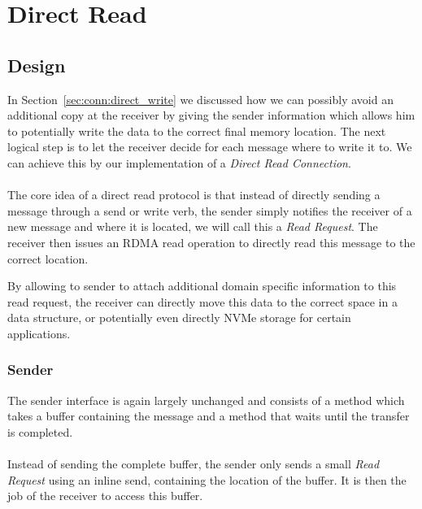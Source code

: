 
\section{Direct Read} \label{sec:conn:direct_read}
\subsection{Design}

In Section~\ref{sec:conn:direct_write} we discussed how we can possibly avoid an additional copy at the receiver by giving 
the sender information which allows him to potentially write the data to the correct final memory location. The next logical
step is to let the receiver decide for each message where to write it to. We can achieve this by our implementation of a
\emph{Direct Read Connection}.

\paragraph{} The core idea of a direct read protocol is that instead of directly sending a message through a send or write 
verb, the sender simply notifies the receiver of a new message and where it is located, we will call this a \emph{Read Request}.
The receiver then issues an RDMA read operation to directly read this message to the correct location.

By allowing to sender to attach additional domain specific information to this read request, the receiver can directly 
move this data to the correct space in a data structure, or potentially even directly NVMe storage for certain applications.


\subsubsection{Sender}
The sender interface is again largely unchanged and consists of a  method which takes a buffer containing the
message and a  method that waits until the transfer is completed.

\paragraph{} Instead of sending the complete buffer, the sender only sends a small \emph{Read Request} using an inline send,
containing the location of the buffer. It is then the job of the receiver to access this buffer.

